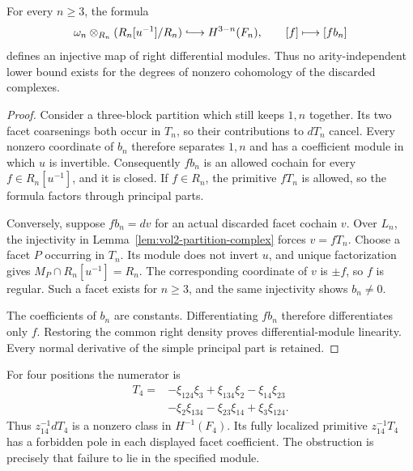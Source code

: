 \begin{theorem}
\label{thm:vol2-outer-injection}
For every $n\geq3$, the formula
\begin{equation}\label{eq:vol2-outer-injection}
 \omega_n\otimes_{R_n}(R_n[u^{-1}]/R_n)
       \lhook\joinrel\longrightarrow H^{3-n}(F_n),
 \qquad [f]\longmapsto[fb_n]
\end{equation}
defines an injective map of right differential modules.
Thus no arity-independent lower bound exists for the degrees
of nonzero cohomology of the discarded complexes.
\end{theorem}

\begin{proof}
Consider a three-block partition which still keeps $1,n$
together. Its two facet coarsenings both occur in $T_n$, so
their contributions to $dT_n$ cancel. Every nonzero coordinate
of $b_n$ therefore separates $1,n$ and has a coefficient module
in which $u$ is invertible. Consequently $fb_n$ is an allowed
cochain for every $f\in R_n[u^{-1}]$, and it is closed.
If $f\in R_n$, the primitive $fT_n$ is allowed, so the formula
factors through principal parts.

Conversely, suppose $fb_n=dv$ for an actual discarded facet
cochain $v$. Over $L_n$, the injectivity in
Lemma~\ref{lem:vol2-partition-complex} forces $v=fT_n$.
Choose a facet $P$ occurring in $T_n$. Its module does not
invert $u$, and unique factorization gives
$M_P\cap R_n[u^{-1}]=R_n$. The corresponding coordinate of
$v$ is $\pm f$, so $f$ is regular. Such a facet exists for
$n\geq3$, and the same injectivity shows $b_n\ne0$.

The coefficients of $b_n$ are constants. Differentiating
$fb_n$ therefore differentiates only $f$. Restoring the common
right density proves differential-module linearity. Every normal
derivative of the simple principal part is retained.
\end{proof}

For four positions the numerator is
\begin{equation}\label{eq:vol2-outer-four-numerator}
 \begin{split}
 T_4={}&-\xi_{124}\xi_3+\xi_{134}\xi_2-\xi_{14}\xi_{23}\\
       &-\xi_2\xi_{134}-\xi_{23}\xi_{14}+\xi_3\xi_{124}.
 \end{split}
\end{equation}
Thus $z_{14}^{-1}dT_4$ is a nonzero class in $H^{-1}(F_4)$.
Its fully localized primitive $z_{14}^{-1}T_4$ has a forbidden
pole in each displayed facet coefficient. The obstruction is
precisely that failure to lie in the specified module.


